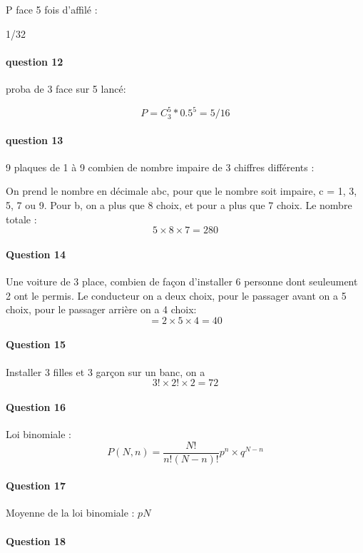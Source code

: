\documentclass[12pt,a4paper]{report}
\begin{document}
P face 5 fois d'affilé :

1/32

\paragraph{question 12}

proba de 3 face sur 5 lancé:

\[
	P = C^5_3 * 0.5^5 = 5/16
\]

\paragraph{question 13}

9 plaques de 1 à 9 combien de nombre impaire de 3 chiffres différents :

On prend le nombre en décimale abc, pour que le nombre soit impaire, c = 1, 3, 5, 7 ou 9. Pour b, on a plus que 8 choix, et pour a plus que 7 choix. Le nombre totale :
\[
	5 \times 8 \times 7 = 280
\]

\paragraph{Question 14}

Une voiture de 3 place, combien de façon d'installer 6 personne dont seuleument 2 ont le permis. Le conducteur on a deux choix, pour le passager avant on a 5 choix, pour le passager arrière on a 4 choix:
\[
	= 2 \times 5 \times 4 = 40
\]

\paragraph{Question 15}

Installer 3 filles et 3 garçon sur un banc, on a 
\[
	3! \times 2! \times 2 = 72 
\]

\paragraph{Question 16}

Loi binomiale :
\[
	P(N, n) = \dfrac{N!}{n!(N-n)!} p^n \times q^{N-n}
\]

\paragraph{Question 17}

Moyenne de la loi binomiale : \(pN\)

\paragraph{Question 18}
\end{document}
